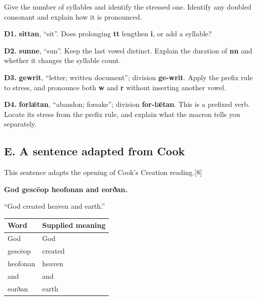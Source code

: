 Give the number of syllables and identify the stressed one. Identify any doubled consonant and explain how it is pronounced.

\textbf{D1.} \textbf{sittan}, “sit”. Does prolonging \textbf{tt} lengthen \textbf{i}, or add a syllable?

\textbf{D2.} \textbf{sunne}, “sun”. Keep the last vowel distinct. Explain the duration of \textbf{nn} and whether it changes the syllable count.

\textbf{D3.} \textbf{gewrit}, “letter; written document”; division \textbf{ge-writ}. Apply the prefix rule to stress, and pronounce both \textbf{w} and \textbf{r} without inserting another vowel.

\textbf{D4.} \textbf{forlǣtan}, “abandon; forsake”; division \textbf{for-lǣtan}. This is a prefixed verb. Locate its stress from the prefix rule, and explain what the macron tells you separately.

\subsection*{E. A sentence adapted from Cook}

This sentence adapts the opening of Cook's Creation reading.[8]

\textbf{God gescēop heofonan and eorðan.}\par\nobreak

“God created heaven and earth.”

\par\begingroup
\fontsize{10.5}{13.2}\selectfont
\setlength{\LTleft}{0pt}\setlength{\LTright}{\fill}
\noindent
\begin{tabular}{@{}>{\raggedright\arraybackslash}p{56.106mm}>{\raggedright\arraybackslash}p{65.082mm}@{}}
\toprule
\textbf{Word} & \textbf{Supplied meaning} \\
\midrule
God & God \\
gescēop & created \\
heofonan & heaven \\
and & and \\
eorðan & earth \\
\bottomrule
\end{tabular}
\par\endgroup

